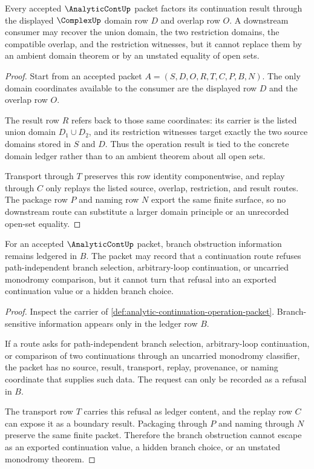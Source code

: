\begin{theorem}
\label{thm:analytic-continuation-domain-compatibility-scope}
Every accepted $\AnalyticContUp$ packet factors its continuation result through the displayed $\ComplexUp$ domain row $D$ and overlap row $O$. A downstream consumer may recover the union domain, the two restriction domains, the compatible overlap, and the restriction witnesses, but it cannot replace them by an ambient domain theorem or by an unstated equality of open sets.
\end{theorem}
\begin{proof}
Start from an accepted packet $A=(S,D,O,R,T,C,P,B,N)$. The only domain coordinates available to the consumer are the displayed row $D$ and the overlap row $O$.

The result row $R$ refers back to those same coordinates: its carrier is the listed union domain $D_1\cup D_2$, and its restriction witnesses target exactly the two source domains stored in $S$ and $D$. Thus the operation result is tied to the concrete domain ledger rather than to an ambient theorem about all open sets.

Transport through $T$ preserves this row identity componentwise, and replay through $C$ only replays the listed source, overlap, restriction, and result routes. The package row $P$ and naming row $N$ export the same finite surface, so no downstream route can substitute a larger domain principle or an unrecorded open-set equality.
\end{proof}

\begin{theorem}
\label{thm:analytic-continuation-branch-obstruction-non-escape}
For an accepted $\AnalyticContUp$ packet, branch obstruction information remains ledgered in $B$. The packet may record that a continuation route refuses path-independent branch selection, arbitrary-loop continuation, or uncarried monodromy comparison, but it cannot turn that refusal into an exported continuation value or a hidden branch choice.
\end{theorem}
\begin{proof}
Inspect the carrier of \autoref{def:analytic-continuation-operation-packet}. Branch-sensitive information appears only in the ledger row $B$.

If a route asks for path-independent branch selection, arbitrary-loop continuation, or comparison of two continuations through an uncarried monodromy classifier, the packet has no source, result, transport, replay, provenance, or naming coordinate that supplies such data. The request can only be recorded as a refusal in $B$.

The transport row $T$ carries this refusal as ledger content, and the replay row $C$ can expose it as a boundary result. Packaging through $P$ and naming through $N$ preserve the same finite packet. Therefore the branch obstruction cannot escape as an exported continuation value, a hidden branch choice, or an unstated monodromy theorem.
\end{proof}

